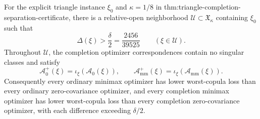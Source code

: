 For the explicit triangle instance \(\xi_0\) and \(\kappa=1/8\) in thm:triangle-completion-separation-certificate, there is a relative-open neighborhood \(\mathcal U\subset\mathfrak X_\kappa\) containing \(\xi_0\) such that
\[
\Delta(\xi)>\frac{\delta}{2}=\frac{2456}{39525}
\qquad(\xi\in\mathcal U).
\]
Throughout \(\mathcal U\), the completion optimizer correspondences contain no singular classes and satisfy
\[
\mathcal A_0^+(\xi)=\iota_\xi(\mathcal A_0(\xi)),
\qquad
\mathcal A_{\mathrm{mm}}^+(\xi)=\iota_\xi(\mathcal A_{\mathrm{mm}}(\xi)).
\]
Consequently every ordinary minimax optimizer has lower worst-copula loss than every ordinary zero-covariance optimizer, and every completion minimax optimizer has lower worst-copula loss than every completion zero-covariance optimizer, with each difference exceeding \(\delta/2\).